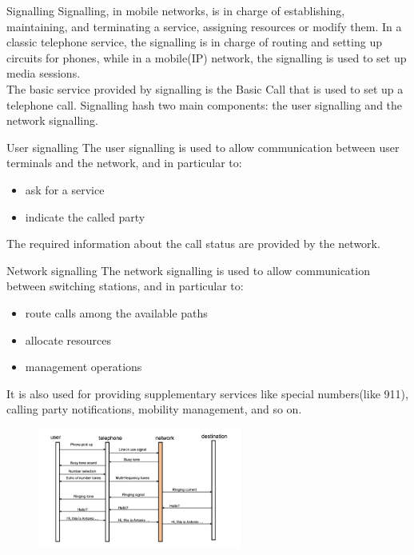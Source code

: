 \begin{section}{Signalling}
  Signalling, in mobile networks, is in charge of establishing, maintaining, and terminating a
  service, assigning resources or modify them.
  In a classic telephone service, the signalling is in charge of routing and setting up circuits for
  phones, while in a mobile(IP) network, the signalling is used to set up media sessions.\\
  The basic service provided by signalling is the Basic Call that is used to set up a telephone
  call. Signalling hash two main components: the user signalling and the network signalling.
  \begin{paragraph}{User signalling}
    The user signalling is used to allow communication between user terminals and the network, and
    in particular to:
    \begin{itemize}
      \item ask for a service
      \item indicate the called party
    \end{itemize}
    The required information about the call status are provided by the network.
  \end{paragraph}
  \begin{paragraph}{Network signalling}
    The network signalling is used to allow communication between switching stations, and in
    particular to:
    \begin{itemize}
      \item route calls among the available paths
      \item allocate resources
      \item management operations
    \end{itemize}
    It is also used for providing supplementary services like special numbers(like 911), calling
    party notifications, mobility management, and so on.
  \end{paragraph}
  \begin{figure}[h]
    \centering
    \includegraphics[width=0.6\textwidth]{img/wireless/signalling.png}

\end{figure}
\end{section}

